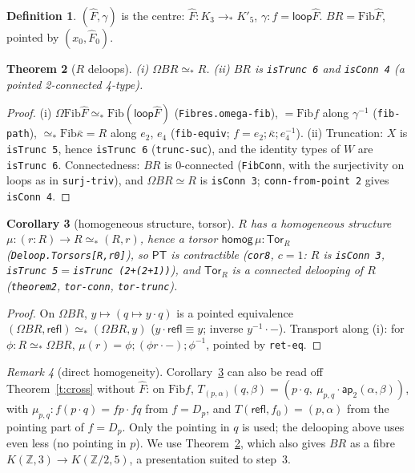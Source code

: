 \documentclass[11pt]{amsart}
\newtheorem{theorem}{Theorem}
\newtheorem{corollary}[theorem]{Corollary}
\theoremstyle{definition}
\newtheorem{definition}[theorem]{Definition}
\theoremstyle{remark}
\newtheorem{remark}[theorem]{Remark}
\newcommand{\Om}{\Omega}
\newcommand{\Z}{\mathbb{Z}}
\newcommand{\code}[1]{\texttt{#1}}
\newcommand{\refl}{\mathsf{refl}}
\newcommand{\lp}{\mathsf{loop}}
\newcommand{\Fib}{\mathrm{Fib}}
\newcommand{\kb}{\bar\kappa}
\begin{document}
\begin{definition}\label{d:BR}
$(\hat F,\gamma)$ is the centre: $\hat F:K_3\to_*K'_5$, $\gamma:f=\lp\hat F$.
$BR=\Fib\hat F$, pointed by $(x_0,\hat F_0)$.
\end{definition}

\begin{theorem}[$R$ deloops]\label{t:BR}
(i) $\Om BR\simeq_*R$. (ii) $BR$ is \code{isTrunc 6} and \code{isConn 4}
(a pointed 2-connected 4-type).
\end{theorem}
\begin{proof}
(i) $\Om\Fib\hat F\simeq_*\Fib(\lp\hat F)$ (\code{Fibres.omega-fib}),
$=\Fib f$ along $\gamma^{-1}$ (\code{fib-path}), $\simeq_*\Fib\kb=R$ along
$e_2$, $e_4$ (\code{fib-equiv}; $f=e_2;\kb;e_4^{-1}$).
(ii) Truncation: $X$ is \code{isTrunc 5}, hence \code{isTrunc 6}
(\code{trunc-suc}), and the identity types of $W$ are \code{isTrunc 6}. Connectedness: $BR$ is 0-connected (\code{FibConn}, with the
surjectivity on loops as in \code{surj-triv}), and $\Om BR\simeq R$ is
\code{isConn 3}; \code{conn-from-point 2} gives \code{isConn 4}.
\end{proof}

\begin{corollary}[homogeneous structure, torsor]\label{c:mu}
$R$ has a homogeneous structure $\mu:(r:R)\to R\simeq_*(R,r)$, hence a
torsor $\mathsf{homog}\,\mu:\mathsf{Tor}_R$ (\code{Deloop.Torsors[R,r0]}),
so $\mathsf{PT}$ is contractible (\code{cor8}, $c=1$: $R$ is \code{isConn 3},
\code{isTrunc 5}$=$\code{isTrunc (2+(2+1))}), and $\mathsf{Tor}_R$ is a
connected delooping of $R$ (\code{theorem2}, \code{tor-conn},
\code{tor-trunc}).
\end{corollary}
\begin{proof}
On $\Om BR$, $y\mapsto(q\mapsto y\cdot q)$ is a pointed equivalence
$(\Om BR,\refl)\simeq_*(\Om BR,y)$ ($y\cdot\refl\equiv y$; inverse
$y^{-1}\cdot-$). Transport along (i): for $\phi:R\simeq_*\Om BR$,
$\mu(r)=\phi;(\phi r\cdot-);\phi^{-1}$, pointed by \code{ret-eq}.
\end{proof}

\begin{remark}[direct homogeneity]
Corollary~\ref{c:mu} can also be read off Theorem~\ref{t:cross} without
$\hat F$: on $\Fib f$, $T_{(p,\alpha)}(q,\beta)=(p\cdot q,\ \mu_{p,q}\cdot\mathsf{ap}_2(\alpha,\beta))$,
with $\mu_{p,q}:f(p\cdot q)=fp\cdot fq$ from $f=D_p$, and $T(\refl,f_0)=(p,\alpha)$
from the pointing part of $f=D_p$. Only the pointing in $q$ is used;
the delooping above uses even less (no pointing in $p$). We use
Theorem~\ref{t:BR}, which also gives $BR$ as a fibre $K(\Z,3)\to K(\Z/2,5)$,
a presentation suited to step~3.
\end{remark}
\end{document}
